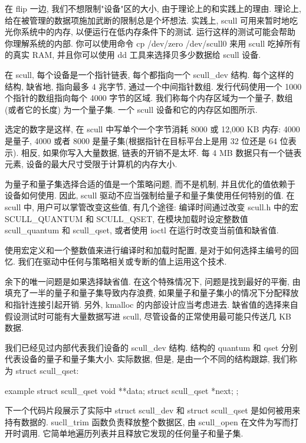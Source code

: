 \documentclass[lang=cn,newtx,10pt,scheme=chinese]{elegantbook}
\begin{document}
在 flip 一边, 我们不想限制"设备"区的大小, 由于理论上的和实践上的理由. 理论上, 给在被管理的数据项施加武断的限制总是个坏想法. 实践上, scull 可用来暂时地吃光你系统中的内存, 以便运行在低内存条件下的测试. 运行这样的测试可能会帮助你理解系统的内部. 你可以使用命令 cp /dev/zero /dev/scull0 来用 scull 吃掉所有的真实 RAM, 并且你可以使用 dd 工具来选择贝多少数据给 scull 设备.

在 scull, 每个设备是一个指针链表, 每个都指向一个 scull\_dev 结构. 每个这样的结构, 缺省地, 指向最多 4 兆字节, 通过一个中间指针数组. 发行代码使用一个 1000 个指针的数组指向每个 4000 字节的区域. 我们称每个内存区域为一个量子, 数组(或者它的长度) 为一个量子集. 一个 scull 设备和它的内存区如图所示.

选定的数字是这样, 在 scull 中写单个一个字节消耗 8000 或 12,000 KB 内存: 4000 是量子, 4000 或者 8000 是量子集(根据指针在目标平台上是用 32 位还是 64 位表示). 相反, 如果你写入大量数据, 链表的开销不是太坏. 每 4 MB 数据只有一个链表元素, 设备的最大尺寸受限于计算机的内存大小.

为量子和量子集选择合适的值是一个策略问题, 而不是机制, 并且优化的值依赖于设备如何使用. 因此, scull 驱动不应当强制给量子和量子集使用任何特别的值. 在 scull 中, 用户可以掌管改变这些值, 有几个途径: 编译时间通过改变 scull.h 中的宏 SCULL\_QUANTUM 和 SCULL\_QSET, 在模块加载时设定整数值 scull\_quantum 和 scull\_qset, 或者使用 ioctl 在运行时改变当前值和缺省值.

使用宏定义和一个整数值来进行编译时和加载时配置, 是对于如何选择主编号的回忆. 我们在驱动中任何与策略相关或专断的值上运用这个技术.

余下的唯一问题是如果选择缺省值. 在这个特殊情况下, 问题是找到最好的平衡, 由填充了一半的量子和量子集导致内存浪费, 如果量子和量子集小的情况下分配释放和指针连接引起开销. 另外, kmalloc 的内部设计应当考虑进去. 缺省值的选择来自假设测试时可能有大量数据写进 scull, 尽管设备的正常使用最可能只传送几 KB 数据.

我们已经见过内部代表我们设备的 scull\_dev 结构. 结构的 quantum 和 qset 分别代表设备的量子和量子集大小. 实际数据, 但是, 是由一个不同的结构跟踪, 我们称为 struct scull\_qset:

\begin{mycode}{example}
struct scull_qset {
    void **data;
    struct scull_qset *next;
};
\end{mycode}

下一个代码片段展示了实际中 struct scull\_dev 和 struct scull\_qset 是如何被用来持有数据的. sucll\_trim 函数负责释放整个数据区, 由 scull\_open 在文件为写而打开时调用. 它简单地遍历列表并且释放它发现的任何量子和量子集.
\end{document}
